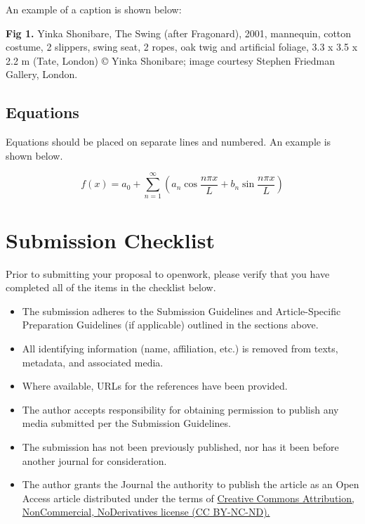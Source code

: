 \documentclass[12pt]{article}
\begin{document}
An example of a caption is shown below: 

\textbf{Fig 1.} Yinka Shonibare, The Swing (after Fragonard), 2001, mannequin, cotton costume, 2 slippers, swing seat, 2 ropes, oak twig and artificial foliage, 3.3 x 3.5 x 2.2 m (Tate, London) © Yinka Shonibare; image courtesy Stephen Friedman Gallery, London.

\subsection{Equations}

Equations should be placed on separate lines and numbered. An example is shown below.

\begin{equation}
f(x) = a_0 + \sum_{n=1}^{\infty} \left( a_n \cos\frac{n\pi x}{L} + b_n \sin\frac{n\pi x}{L} \right)
\end{equation}

\section{Submission Checklist}

Prior to submitting your proposal to openwork, please verify that you have completed all of the items in the checklist below.

\begin{itemize}[noitemsep]
    \item The submission adheres to the Submission Guidelines and Article-Specific Preparation Guidelines (if applicable) outlined in the sections above.
    \item All identifying information (name, affiliation, etc.) is removed from texts, metadata, and associated media.
    \item Where available, URLs for the references have been provided.
    \item The author accepts responsibility for obtaining permission to publish any media submitted per the Submission Guidelines.
    \item The submission has not been previously published, nor has it been before another journal for consideration.
    \item The author grants the Journal the authority to publish the article as an Open Access article distributed under the terms of \href{https://creativecommons.org/licenses/by-nc-nd/4.0/}{Creative Commons Attribution, NonCommercial, NoDerivatives license (CC BY-NC-ND).} 
\end{itemize}

\printbibliography
\end{document}
